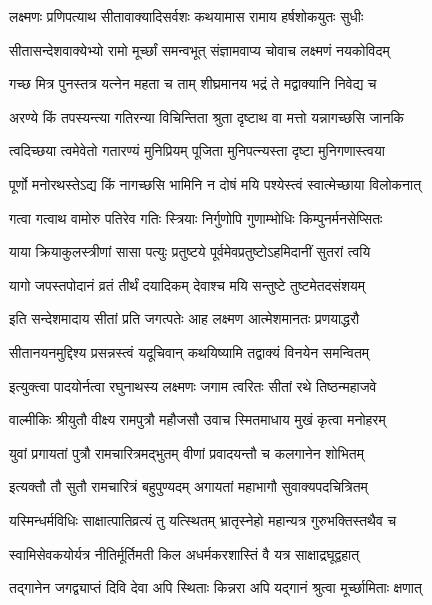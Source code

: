 \twolineshloka
{लक्ष्मणः प्रणिपत्याथ सीतावाक्यादिसर्वशः}
{कथयामास रामाय हर्षशोकयुतः सुधीः}%

\twolineshloka
{सीतासन्देशवाक्येभ्यो रामो मूर्च्छां समन्वभूत्}
{संज्ञामवाप्य चोवाच लक्ष्मणं नयकोविदम्}%

\twolineshloka
{गच्छ मित्र पुनस्तत्र यत्नेन महता च ताम्}
{शीघ्रमानय भद्रं ते मद्वाक्यानि निवेद्य च}%

\twolineshloka
{अरण्ये किं तपस्यन्त्या गतिरन्या विचिन्तिता}
{श्रुता दृष्टाथ वा मत्तो यन्नागच्छसि जानकि}%

\twolineshloka
{त्वदिच्छया त्वमेवेतो गतारण्यं मुनिप्रियम्}
{पूजिता मुनिपत्न्यस्ता दृष्टा मुनिगणास्त्वया}%

\twolineshloka
{पूर्णो मनोरथस्तेऽद्य किं नागच्छसि भामिनि}
{न दोषं मयि पश्येस्त्वं स्वात्मेच्छाया विलोकनात्}%

\twolineshloka
{गत्वा गत्वाथ वामोरु पतिरेव गतिः स्त्रियाः}
{निर्गुणोपि गुणाम्भोधिः किम्पुनर्मनसेप्सितः}%

\twolineshloka
{याया क्रियाकुलस्त्रीणां सासा पत्युः प्रतुष्टये}
{पूर्वमेवप्रतुष्टोऽहमिदानीं सुतरां त्वयि}%

\twolineshloka
{यागो जपस्तपोदानं व्रतं तीर्थं दयादिकम्}
{देवाश्च मयि सन्तुष्टे तुष्टमेतदसंशयम्}%


\twolineshloka
{इति सन्देशमादाय सीतां प्रति जगत्पतेः}
{आह लक्ष्मण आत्मेशमानतः प्रणयाद्धरौ}%

\twolineshloka
{सीतानयनमुद्दिश्य प्रसन्नस्त्वं यदूचिवान्}
{कथयिष्यामि तद्वाक्यं विनयेन समन्वितम्}%

\twolineshloka
{इत्युक्त्वा पादयोर्नत्वा रघुनाथस्य लक्ष्मणः}
{जगाम त्वरितः सीतां रथे तिष्ठन्महाजवे}%

\twolineshloka
{वाल्मीकिः श्रीयुतौ वीक्ष्य रामपुत्रौ महौजसौ}
{उवाच स्मितमाधाय मुखं कृत्वा मनोहरम्}%

\twolineshloka
{युवां प्रगायतां पुत्रौ रामचारित्रमद्भुतम्}
{वीणां प्रवादयन्तौ च कलगानेन शोभितम्}%

\twolineshloka
{इत्यक्तौ तौ सुतौ रामचारित्रं बहुपुण्यदम्}
{अगायतां महाभागौ सुवाक्यपदचित्रितम्}%

\twolineshloka
{यस्मिन्धर्मविधिः साक्षात्पातिव्रत्यं तु यत्स्थितम्}
{भ्रातृस्नेहो महान्यत्र गुरुभक्तिस्तथैव च}%

\twolineshloka
{स्वामिसेवकयोर्यत्र नीतिर्मूर्तिमती किल}
{अधर्मकरशास्तिं वै यत्र साक्षाद्रघूद्वहात्}%

\twolineshloka
{तद्गानेन जगद्व्याप्तं दिवि देवा अपि स्थिताः}
{किन्नरा अपि यद्गानं श्रुत्वा मूर्च्छामिताः क्षणात्}%

